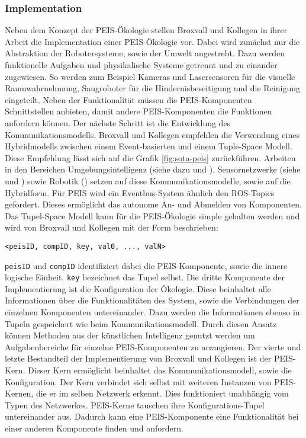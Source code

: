 \subsubsection{Implementation}
Neben dem Konzept der PEIS-Ökologie stellen Broxvall und Kollegen in ihrer Arbeit die Implementation einer PEIS-Ökologie vor. Dabei wird zunächst nur die Abstraktion der Robotersysteme, sowie der Umwelt angestrebt. Dazu werden funktionelle Aufgaben und physikalische Systeme getrennt und zu einander zugewiesen. So werden zum Beispiel Kameras und Lasersensoren für die visuelle Raumwahrnehmung, Saugroboter für die Hindernisbeseitigung und die Reinigung eingeteilt. Neben der Funktionalität müssen die PEIS-Komponenten Schnittstellen anbieten, damit andere PEIS-Komponenten die Funktionen anfordern können. Der nächste Schritt ist die Entwicklung des Kommunikationsmodells. Broxvall und Kollegen empfehlen die Verwendung eines Hybridmodells zwischen einem Event-basierten und einem Tuple-Space Modell. Diese Empfehlung lässt sich auf die Grafik \ref{fig:sota-peis} zurückführen. Arbeiten in den Bereichen Umgebungsintelligenz (siehe dazu \cite{arregui2003stitch} und \cite{siegemund2004context}), Sensornetzwerke (siehe \cite{adjie1999design} und \cite{heidemann2001building}) sowie Robotik (\cite{caceres2003real}) setzen auf diese Kommunikationsmodelle, sowie auf die Hybridform. Für PEIS wird ein Eventbus-System ähnlich den ROS-Topics gefordert. Dieses ermöglicht das autonome An- und Abmelden von Komponenten. Das Tupel-Space Modell kann für die PEIS-Ökologie simple gehalten werden und wird von Broxvall und Kollegen mit der Form beschrieben:

{\tt <peisID, compID, key, val0, ..., valN>}

{\tt peisID} und {\tt compID} identifiziert dabei die PEIS-Komponente, sowie die innere logische Einheit. {\tt key} bezeichnet das Tupel selbst. Die dritte Komponente der Implementierung ist die Konfiguration der Ökologie. Diese beinhaltet alle Informationen über die Funktionalitäten des System, sowie die Verbindungen der einzelnen Komponenten untereinander. Dazu werden die Informationen ebenso in Tupeln gespeichert wie beim Kommunikationsmodell. Durch diesen Ansatz können Methoden aus der künstlichen Intelligenz genutzt werden um Aufgabenbereiche für einzelne PEIS-Komponenten zu arrangieren.\cite{lundh2005can} Der vierte und letzte Bestandteil der Implementierung von Broxvall und Kollegen ist der PEIS-Kern. Dieser Kern ermöglicht beinhaltet das Kommunikationsmodell, sowie die Konfiguration. Der Kern verbindet sich selbst mit weiteren Instanzen von PEIS-Kernen, die er im selben Netzwerk erkennt. Dies funktioniert unabhängig vom Typen des Netzwerkes. PEIS-Kerne tauschen ihre Konfigurations-Tupel untereinander aus. Dadurch kann eine PEIS-Komponente eine Funktionalität bei einer anderen Komponente finden und anfordern.\cite{Saffiotti:2005:PEA:1107548.1107615}

